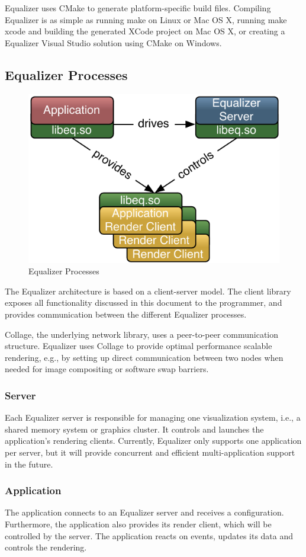 \documentclass[10pt,a4]{scrartcl}
\begin{document}
Equalizer uses CMake to generate platform-specific build files. Compiling
Equalizer is as simple as running \textsf{make} on Linux or Mac OS X, running
\textsf{make xcode} and building the generated XCode project on Mac OS X, or
creating a Equalizer Visual Studio solution using \textsf{CMake} on Windows.

\subsection{Equalizer Processes}

\begin{figure}
  \includegraphics[width=.382\textwidth]{images/processes.pdf}
  {\caption{\label{fProcesses}Equalizer Processes}}
\end{figure}
The Equalizer architecture is based on a client-server model. The client
library exposes all functionality discussed in this document to the
programmer, and provides communication between the different Equalizer
processes.

Collage, the underlying network library, uses a peer-to-peer communication
structure. Equalizer uses Collage to provide optimal performance scalable
rendering, e.g., by setting up direct communication between two nodes when
needed for image compositing or software swap barriers.

\subsubsection{Server}
Each Equalizer server is responsible for managing one visualization
system, i.e., a shared memory system or graphics cluster.  It controls
and launches the application's rendering clients.  Currently, Equalizer
only supports one application per server, but it will provide
concurrent and efficient multi-application support in the future.

\subsubsection{Application}

The application connects to an Equalizer server and receives a
configuration.  Furthermore, the application also provides its render
client, which will be controlled by the server. The application reacts
on events, updates its data and controls the rendering.
\end{document}
